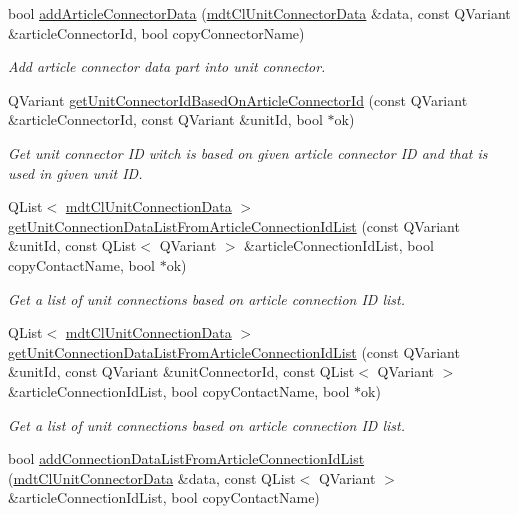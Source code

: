 \begin{DoxyCompactItemize}
bool \hyperlink{classmdt_cl_unit_ad9b29bd9b0ad70047d439e04f109a1cd}{add\-Article\-Connector\-Data} (\hyperlink{classmdt_cl_unit_connector_data}{mdt\-Cl\-Unit\-Connector\-Data} \&data, const Q\-Variant \&article\-Connector\-Id, bool copy\-Connector\-Name)
\begin{DoxyCompactList}\small\item\em Add article connector data part into unit connector. \end{DoxyCompactList}\item 
Q\-Variant \hyperlink{classmdt_cl_unit_a08e75aefd5bada2cfd1a0393b6e6c460}{get\-Unit\-Connector\-Id\-Based\-On\-Article\-Connector\-Id} (const Q\-Variant \&article\-Connector\-Id, const Q\-Variant \&unit\-Id, bool $\ast$ok)
\begin{DoxyCompactList}\small\item\em Get unit connector I\-D witch is based on given article connector I\-D and that is used in given unit I\-D. \end{DoxyCompactList}\item 
Q\-List$<$ \hyperlink{classmdt_cl_unit_connection_data}{mdt\-Cl\-Unit\-Connection\-Data} $>$ \hyperlink{classmdt_cl_unit_a93002a29107f78901fe3aa87a83005db}{get\-Unit\-Connection\-Data\-List\-From\-Article\-Connection\-Id\-List} (const Q\-Variant \&unit\-Id, const Q\-List$<$ Q\-Variant $>$ \&article\-Connection\-Id\-List, bool copy\-Contact\-Name, bool $\ast$ok)
\begin{DoxyCompactList}\small\item\em Get a list of unit connections based on article connection I\-D list. \end{DoxyCompactList}\item 
Q\-List$<$ \hyperlink{classmdt_cl_unit_connection_data}{mdt\-Cl\-Unit\-Connection\-Data} $>$ \hyperlink{classmdt_cl_unit_ac593b17febfe5312230296630d61ea66}{get\-Unit\-Connection\-Data\-List\-From\-Article\-Connection\-Id\-List} (const Q\-Variant \&unit\-Id, const Q\-Variant \&unit\-Connector\-Id, const Q\-List$<$ Q\-Variant $>$ \&article\-Connection\-Id\-List, bool copy\-Contact\-Name, bool $\ast$ok)
\begin{DoxyCompactList}\small\item\em Get a list of unit connections based on article connection I\-D list. \end{DoxyCompactList}\item 
bool \hyperlink{classmdt_cl_unit_a9aa3d52f4e6d79fa003d96e04be8223e}{add\-Connection\-Data\-List\-From\-Article\-Connection\-Id\-List} (\hyperlink{classmdt_cl_unit_connector_data}{mdt\-Cl\-Unit\-Connector\-Data} \&data, const Q\-List$<$ Q\-Variant $>$ \&article\-Connection\-Id\-List, bool copy\-Contact\-Name)

\end{DoxyCompactItemize}
